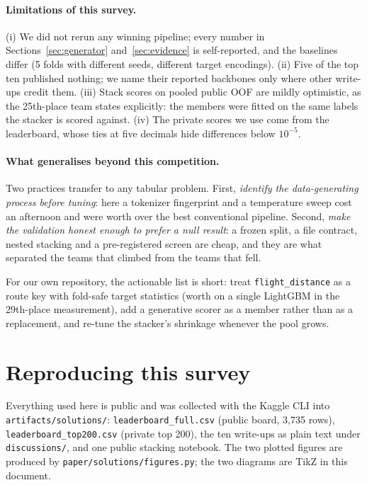 \paragraph{Limitations of this survey.}
(i) We did not rerun any winning pipeline; every number in Sections~\ref{sec:generator}
and~\ref{sec:evidence} is self-reported, and the baselines differ (5 folds with different
seeds, different target encodings). (ii) Five of the top ten published nothing; we name
their reported backbones only where other write-ups credit them. (iii) Stack scores on
pooled public OOF are mildly optimistic, as the 25th-place team states explicitly: the
members were fitted on the same labels the stacker is scored against. (iv) The private
scores we use come from the leaderboard, whose ties at five decimals hide differences below
$10^{-5}$.

\paragraph{What generalises beyond this competition.}
Two practices transfer to any tabular problem. First, \emph{identify the data-generating
process before tuning}: here a tokenizer fingerprint and a temperature sweep cost an
afternoon and were worth  over the best conventional pipeline. Second, \emph{make
the validation honest enough to prefer a null result}: a frozen split, a file contract,
nested stacking and a pre-registered screen are cheap, and they are what separated the
teams that climbed from the teams that fell.

For our own repository, the actionable list is short: treat \texttt{flight\_distance} as a
route key with fold-safe target statistics (worth  on a single LightGBM in the
29th-place measurement), add a generative scorer as a member rather than as a replacement,
and re-tune the stacker's shrinkage whenever the pool grows.

\section{Reproducing this survey}
\label{sec:repro}

\begin{sloppypar}
Everything used here is public and was collected with the Kaggle CLI into
\texttt{artifacts/solutions/}: \texttt{leaderboard\_full.csv} (public board, 3{,}735 rows),
\texttt{leaderboard\_top200.csv} (private top 200), the ten write-ups as plain text under
\texttt{discussions/}, and one public stacking notebook. The two plotted figures are
produced by \texttt{paper/solutions/figures.py}; the two diagrams are TikZ in this
document.
\end{sloppypar}

